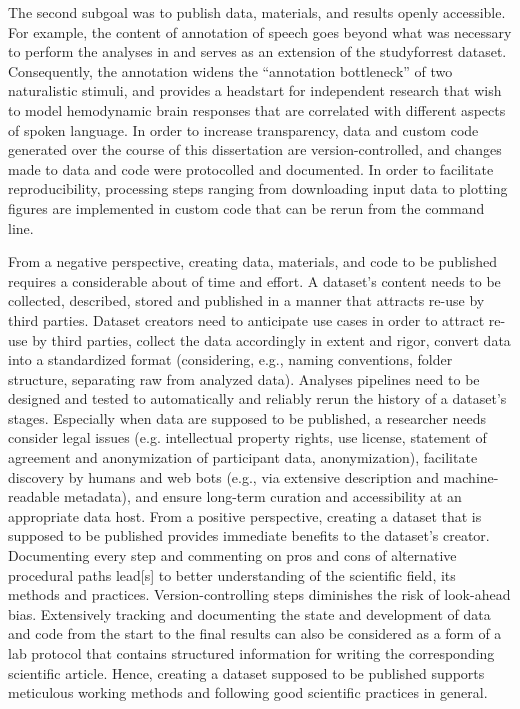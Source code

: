 %
The second subgoal was to publish data, materials, and results openly
accessible.
%
For example, the content of annotation of speech \citep{haeusler2021speechanno}
goes beyond what was necessary to perform the analyses in
\citet{haeusler2022processing} and serves as an extension of the studyforrest
dataset.
%
Consequently, the annotation widens the ``annotation bottleneck'' \citep[][p.
16]{aliko2020naturalistic} of two naturalistic stimuli, and provides a headstart
for independent research that wish to model hemodynamic brain responses that are
correlated with different aspects of spoken language.
%
In order to increase transparency, data and custom code generated over the
course of this dissertation are version-controlled, and changes made to data and
code were protocolled and documented.
%
In order to facilitate reproducibility, processing steps ranging from
downloading input data to plotting figures are implemented in custom code that
can be rerun from the command line.

From a negative perspective, creating data, materials, and code to be published
requires a considerable about of time and effort.
%
A dataset's content needs to be collected, described, stored and published in a
manner that attracts re-use by third parties.
%
Dataset creators need to anticipate use cases in order to attract re-use by
third parties, collect the data accordingly in extent and rigor, convert data
into a standardized format (considering, e.g., naming conventions, folder
structure, separating raw from analyzed data).
%
Analyses pipelines need to be designed and tested to automatically and reliably
rerun the history of a dataset's stages.
Especially when data are supposed to be published, a researcher needs consider
legal issues (e.g. intellectual property rights, use license, statement of
agreement and anonymization of participant data, anonymization), facilitate
discovery by humans and web bots (e.g., via extensive description and
machine-readable metadata), and ensure long-term curation and accessibility at
an appropriate data host.
%
From a positive perspective, creating a dataset that is supposed to be published
provides immediate benefits to the dataset's creator.
%
Documenting every step and commenting on pros and cons of alternative procedural
paths lead[s] to better understanding of the scientific field, its methods and
practices.
%
Version-controlling steps diminishes the risk of look-ahead bias.
%
Extensively tracking and documenting the state and development of data and code
from the start to the final results can also be considered as a form of a lab
protocol that contains structured information for writing the corresponding
scientific article.
%
Hence, creating a dataset supposed to be published supports meticulous working
methods and following good scientific practices in general.


